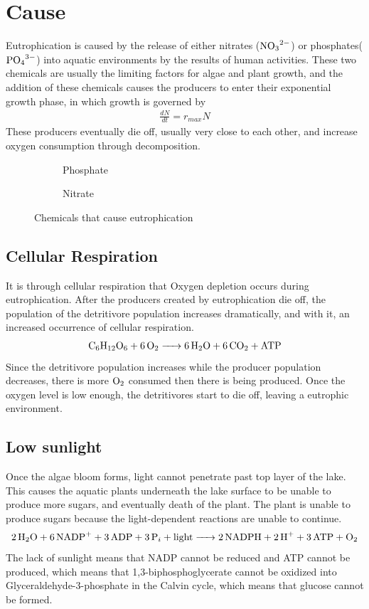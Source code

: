 \documentclass{article}
\begin{document}
\section{Cause}
Eutrophication is caused by the release of either nitrates ($\ce{NO3^2-}$) or phosphates($\ce{PO4^3-}$) into aquatic environments by the results of human activities.
These two chemicals are usually the limiting factors for algae and plant growth, and the addition of these chemicals causes the producers to enter their exponential growth phase, in which growth is governed by
\begin{align}
    \frac{dN}{dt} = r_{max}N
\end{align}
These producers eventually die off, usually very close to each other, and increase oxygen consumption through decomposition.
\begin{figure}[h]
    \begin{subfigure}{.5\textwidth}
        \centering
        \caption{Phosphate}
    \end{subfigure}%
    \begin{subfigure}{.5\textwidth}
        \centering
        \caption{Nitrate}
    \end{subfigure}
    \caption{Chemicals that cause eutrophication}
\end{figure}
    \subsection{Cellular Respiration}
    It is through cellular respiration that Oxygen depletion occurs during eutrophication. 
    After the producers created by eutrophication die off, the population of the detritivore population increases dramatically, and with it, an increased occurrence of cellular respiration.
    \begin{align}
        \ce{C6H12O6 + 6O2 -> 6H2O + 6CO2 + ATP}
    \end{align}
    Since the detritivore population increases while the producer population decreases, there is more $\ce{O2}$ consumed then there is being produced. Once the oxygen level is low enough, the detritivores start to die off, leaving a eutrophic environment.
    \subsection{Low sunlight}
    Once the algae bloom forms, light cannot penetrate past top layer of the lake.
    This causes the aquatic plants underneath the lake surface to be unable to produce more sugars, and eventually death of the plant. The plant is unable to produce sugars because the light-dependent reactions are unable to continue.
    \begin{align}
    	\ce{2H2O + 6NADP+ + 3ADP + 3P_i + light -> 2NADPH + 2H+ + 3ATP + O2}
    \end{align}
    The lack of sunlight means that NADP cannot be reduced and ATP cannot be produced, which means that 1,3-biphosphoglycerate cannot be oxidized into Glyceraldehyde-3-phosphate in the Calvin cycle, which means that glucose cannot be formed.
\end{document}
